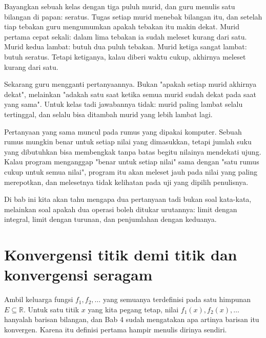 \begin{untukanak}
Bayangkan sebuah kelas dengan tiga puluh murid, dan guru menulis satu bilangan
di papan: seratus. Tugas setiap murid menebak bilangan itu, dan setelah tiap
tebakan guru mengumumkan apakah tebakan itu makin dekat. Murid pertama cepat
sekali: dalam lima tebakan ia sudah meleset kurang dari satu. Murid kedua
lambat: butuh dua puluh tebakan. Murid ketiga sangat lambat: butuh seratus.
Tetapi ketiganya, kalau diberi waktu cukup, akhirnya meleset kurang dari satu.

Sekarang guru mengganti pertanyaannya. Bukan "apakah setiap murid akhirnya
dekat", melainkan "adakah satu saat ketika semua murid sudah dekat pada saat
yang sama". Untuk kelas tadi jawabannya tidak: murid paling lambat selalu
tertinggal, dan selalu bisa ditambah murid yang lebih lambat lagi.

Pertanyaan yang sama muncul pada rumus yang dipakai komputer. Sebuah rumus
mungkin benar untuk setiap nilai yang dimasukkan, tetapi jumlah suku yang
dibutuhkan bisa membengkak tanpa batas begitu nilainya mendekati ujung. Kalau
program menganggap "benar untuk setiap nilai" sama dengan "satu rumus cukup
untuk semua nilai", program itu akan meleset jauh pada nilai yang paling
merepotkan, dan melesetnya tidak kelihatan pada uji yang dipilih penulisnya.

Di bab ini kita akan tahu mengapa dua pertanyaan tadi bukan soal kata-kata,
melainkan soal apakah dua operasi boleh ditukar urutannya: limit dengan
integral, limit dengan turunan, dan penjumlahan dengan keduanya.
\end{untukanak}

\section{Konvergensi titik demi titik dan konvergensi seragam}

Ambil keluarga fungsi $f_1,f_2,\ldots$ yang semuanya terdefinisi pada satu
himpunan $E\subseteq\mathbb{R}$. Untuk satu titik $x$ yang kita pegang tetap,
nilai $f_1(x),f_2(x),\ldots$ hanyalah barisan bilangan, dan Bab 4 sudah
mengatakan apa artinya barisan itu konvergen. Karena itu definisi pertama hampir
menulis dirinya sendiri.

